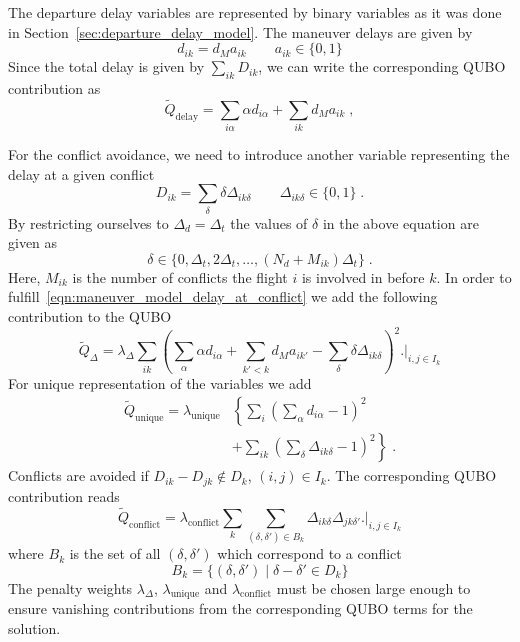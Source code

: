 The departure delay variables are represented by binary variables as it was done in Section~\ref{sec:departure_delay_model}.
The maneuver delays are given by
\begin{equation*}
    d_{ik} = d_M a_{ik} \qquad a_{ik} \in \{0, 1\}
\end{equation*}
Since the total delay is given by $\sum_{ik} D_{ik}$, we can write the corresponding QUBO contribution as
\begin{equation*}
    \tilde Q_\text{delay} = \sum_{i\alpha} \alpha d_{i\alpha}  + \sum_{ik} d_M a_{ik}\; ,
\end{equation*}

For the conflict avoidance, we need to introduce another variable representing the delay at a given conflict
\begin{equation*}
    D_{ik} = \sum_\delta \delta \Delta_{ik\delta} \qquad \Delta_{ik\delta} \in \{0, 1\} \; .
\end{equation*}
By restricting ourselves to $\Delta_d = \Delta_t$ the values of $\delta$ in the above equation are given as
\begin{equation*}
    \delta \in \{0, \Delta_t, 2\Delta_t, \dots,  (N_d + M_{ik}) \Delta_t\} \; .
\end{equation*}
Here, $M_{ik}$ is the number of conflicts the flight $i$ is involved in before $k$.
In order to fulfill~\eqref{eqn:maneuver_model_delay_at_conflict} we add the following contribution to the QUBO
\begin{equation*}
  \tilde Q_\Delta = \lambda_\Delta \sum_{ik}  {\left( \sum_{\alpha} \alpha d_{i\alpha}  + \sum_{k'<k} d_M a_{ik'} - \sum_\delta \delta \Delta_{ik\delta}\right)}^2 \biggl. \biggr|_{i, j \in I_k}
\end{equation*}
For unique representation of the variables we add 
\begin{align*}
  \tilde Q_\text{unique} = \lambda_\text{unique} & \left\{  \sum_i {\left( \sum_\alpha d_{i\alpha} - 1 \right)}^2 \right. \\
  & \left. + \sum_{ik} {\left( \sum_\delta \Delta_{ik\delta} - 1 \right)}^2 \right\} \; .
\end{align*}
Conflicts are avoided if $D_{ik} - D_{jk} \notin D_k$, $(i, j) \in I_k$. 
The corresponding QUBO contribution reads
\begin{equation*}
    \tilde Q_\text{conflict} = \lambda_\text{conflict} \sum_k \sum_{(\delta, \delta') \in B_k} \Delta_{ik\delta} \Delta_{jk\delta'} \biggl. \biggr|_{i, j \in I_k}
\end{equation*}
where $B_k$ is the set of all $(\delta, \delta')$ which correspond to a conflict
\begin{equation*}
    B_k = \{(\delta, \delta') \; | \; \delta - \delta' \in D_k\}
\end{equation*}
The penalty weights $\lambda_\Delta$, $\lambda_\text{unique}$ and $\lambda_\text{conflict}$ must be chosen large enough to ensure vanishing contributions from the corresponding QUBO terms for the solution.

